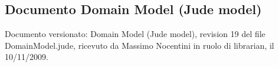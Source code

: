\subsection{Documento Domain Model (Jude model)}
Documento versionato: Domain Model (Jude model), revision 19 del file
DomainModel.jude, ricevuto da Massimo Nocentini in ruolo di librarian, il
10/11/2009.

